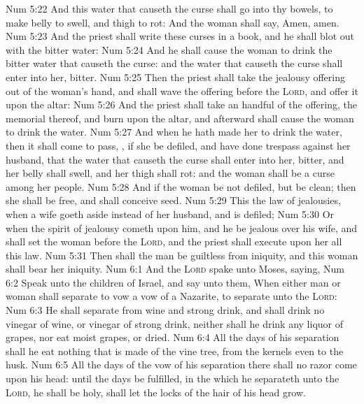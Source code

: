\vs Num 5:22 And this water that causeth the curse shall go into thy bowels, to make  belly to swell, and  thigh to rot: And the woman shall say, Amen, amen.
\vs Num 5:23 And the priest shall write these curses in a book, and he shall blot  out with the bitter water:
\vs Num 5:24 And he shall cause the woman to drink the bitter water that causeth the curse: and the water that causeth the curse shall enter into her,  bitter.
\vs Num 5:25 Then the priest shall take the jealousy offering out of the woman's hand, and shall wave the offering before the \textsc{Lord}, and offer it upon the altar:
\vs Num 5:26 And the priest shall take an handful of the offering,  the memorial thereof, and burn  upon the altar, and afterward shall cause the woman to drink the water.
\vs Num 5:27 And when he hath made her to drink the water, then it shall come to pass, , if she be defiled, and have done trespass against her husband, that the water that causeth the curse shall enter into her,  bitter, and her belly shall swell, and her thigh shall rot: and the woman shall be a curse among her people.
\vs Num 5:28 And if the woman be not defiled, but be clean; then she shall be free, and shall conceive seed.
\vs Num 5:29 This  the law of jealousies, when a wife goeth aside  instead of her husband, and is defiled;
\vs Num 5:30 Or when the spirit of jealousy cometh upon him, and he be jealous over his wife, and shall set the woman before the \textsc{Lord}, and the priest shall execute upon her all this law.
\vs Num 5:31 Then shall the man be guiltless from iniquity, and this woman shall bear her iniquity.
\vs Num 6:1 And the \textsc{Lord} spake unto Moses, saying,
\vs Num 6:2 Speak unto the children of Israel, and say unto them, When either man or woman shall separate  to vow a vow of a Nazarite, to separate  unto the \textsc{Lord}:
\vs Num 6:3 He shall separate  from wine and strong drink, and shall drink no vinegar of wine, or vinegar of strong drink, neither shall he drink any liquor of grapes, nor eat moist grapes, or dried.
\vs Num 6:4 All the days of his separation shall he eat nothing that is made of the vine tree, from the kernels even to the husk.
\vs Num 6:5 All the days of the vow of his separation there shall no razor come upon his head: until the days be fulfilled, in the which he separateth  unto the \textsc{Lord}, he shall be holy,  shall let the locks of the hair of his head grow.
